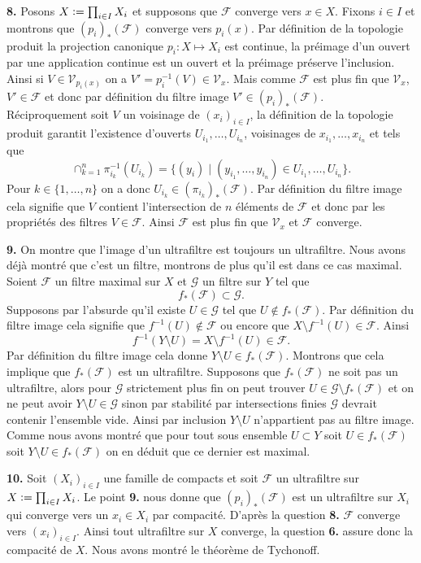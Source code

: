 \documentclass[12pt]{article}
\newcommand{\defeq}{\vcentcolon=}
\begin{document}
\textbf{8.} Posons $X \defeq \prod_{i \in I}X_{i}$ et supposons que $\mathcal{F}$ converge vers $x \in X$. Fixons $i \in I$ et montrons que $(p_{i})_{*}(\mathcal{F})$ converge vers $p_{i}(x)$. Par définition de la topologie produit la projection canonique $p_{i} : X \longmapsto X_{i}$ est continue, la préimage d'un ouvert par une application continue est un ouvert et la préimage préserve l'inclusion. Ainsi si $V \in \mathcal{V}_{p_{i}(x)}$ on a $V' = p_{i}^{-1}(V) \in \mathcal{V}_{x}$. Mais comme $\mathcal{F}$ est plus fin que $\mathcal{V}_{x}$, $V' \in \mathcal{F}$ et donc par définition du filtre image $V' \in (p_{i})_{*}(\mathcal{F})$.
\\
Réciproquement soit $V$ un voisinage de  $(x_{i})_{i\in I}$, la définition de la topologie produit garantit l'existence d'ouverts $U_{i_{1}}, \ldots, U_{i_{n}}$, voisinages de $x_{i_{1}}, \ldots, x_{i_{n}}$ et tels que \[
        \cap_{k = 1}^{n}\pi^{-1}_{i_{k}}(U_{i_{k}}) = \{(y_{i}) \;|\; (y_{i_{1}}, \ldots, y_{i_{n}}) \in U_{i_{1}}, \ldots, U_{i_{n}}\} 
.\] Pour $k \in \{1, \ldots, n\}$ on a donc $U_{i_{k}} \in (\pi_{i_{k}})_{*}(\mathcal{F})$. Par définition du filtre image cela signifie que $V$ contient l'intersection de $n$ éléments de $\mathcal{F}$ et donc par les propriétés des filtres $V \in \mathcal{F}$. Ainsi $\mathcal{F}$ est plus fin que $\mathcal{V}_{x}$ et $\mathcal{F}$ converge.

\medskip

\textbf{9.} On montre que l'image d'un ultrafiltre est toujours un ultrafiltre. Nous avons déjà montré que c'est un filtre, montrons de plus qu'il est dans ce cas maximal. Soient $\mathcal{F}$ un filtre maximal sur $X$ et $\mathcal{G}$ un filtre sur $Y$ tel que  \[
        f_{*}(\mathcal{F}) \subset \mathcal{G}
        .\] Supposons par l'absurde qu'il existe $U \in \mathcal{G}$ tel que $U \not\in f_{*}(\mathcal{F})$. Par définition du filtre image cela signifie que $f^{-1}(U) \not\in \mathcal{F}$ ou encore que $X\setminus f^{-1}(U) \in \mathcal{F}$. Ainsi \[f^{-1}(Y\setminus U) = X \setminus f^{-1}(U) \in \mathcal{F}.\] Par définition du filtre image cela donne $Y\setminus U \in f_{*}(\mathcal{F})$. Montrons que cela implique que $f_{*}(\mathcal{F})$ est un ultrafiltre. Supposons que $f_{*}(\mathcal{F})$ ne soit pas un ultrafiltre, alors pour $\mathcal{G}$ strictement plus fin on peut trouver $U \in \mathcal{G}\setminus f_{*}(\mathcal{F})$ et on ne peut avoir $Y \setminus U \in \mathcal{G}$ sinon par stabilité par intersections finies $\mathcal{G}$ devrait contenir l'ensemble vide. Ainsi par inclusion $Y \setminus U$ n'appartient pas au filtre image. Comme nous avons montré que pour tout sous ensemble $U \subset Y$ soit $U \in f_{*}(\mathcal{F})$ soit $Y \setminus U \in f_{*}(\mathcal{F})$ on en déduit que ce dernier est maximal. 
\medskip

\textbf{10.} Soit $(X_{i})_{i\in I}$ une famille de compacts et soit $\mathcal{F}$ un ultrafiltre sur $X \defeq \prod_{i\in I}X_{i}$. Le point \textbf{9.} nous donne que $(p_{i})_{*}(\mathcal{F})$ est un ultrafiltre sur $X_{i}$ qui converge vers un $x_{i} \in X_{i}$ par compacité. D'après la question \textbf{8.} $\mathcal{F}$ converge vers $(x_{i})_{i\in I}$. Ainsi tout ultrafiltre sur $X$ converge, la question \textbf{6.} assure donc la compacité de $X$. Nous avons montré le théorème de Tychonoff.  
\end{document}
